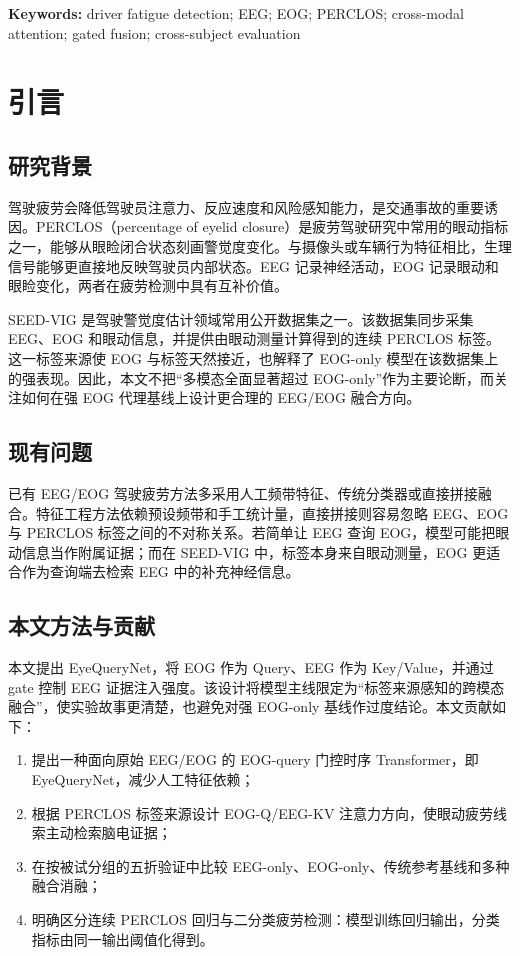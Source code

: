 \documentclass[UTF8,a4paper,10pt,fontset=windows]{ctexart}
\newcommand{\method}{EyeQueryNet}
\begin{document}
\noindent\textbf{Keywords:} driver fatigue detection; EEG; EOG; PERCLOS; cross-modal attention; gated fusion; cross-subject evaluation

\section{引言}

\subsection{研究背景}
驾驶疲劳会降低驾驶员注意力、反应速度和风险感知能力，是交通事故的重要诱因。PERCLOS（percentage of eyelid closure）是疲劳驾驶研究中常用的眼动指标之一，能够从眼睑闭合状态刻画警觉度变化\cite{dinges1998perclos}。与摄像头或车辆行为特征相比，生理信号能够更直接地反映驾驶员内部状态。EEG 记录神经活动，EOG 记录眼动和眼睑变化，两者在疲劳检测中具有互补价值。

SEED-VIG 是驾驶警觉度估计领域常用公开数据集之一。该数据集同步采集 EEG、EOG 和眼动信息，并提供由眼动测量计算得到的连续 PERCLOS 标签\cite{seedvig,zheng2017}。这一标签来源使 EOG 与标签天然接近，也解释了 EOG-only 模型在该数据集上的强表现。因此，本文不把“多模态全面显著超过 EOG-only”作为主要论断，而关注如何在强 EOG 代理基线上设计更合理的 EEG/EOG 融合方向。

\subsection{现有问题}
已有 EEG/EOG 驾驶疲劳方法多采用人工频带特征、传统分类器或直接拼接融合。特征工程方法依赖预设频带和手工统计量，直接拼接则容易忽略 EEG、EOG 与 PERCLOS 标签之间的不对称关系。若简单让 EEG 查询 EOG，模型可能把眼动信息当作附属证据；而在 SEED-VIG 中，标签本身来自眼动测量，EOG 更适合作为查询端去检索 EEG 中的补充神经信息。

\subsection{本文方法与贡献}
本文提出 \method，将 EOG 作为 Query、EEG 作为 Key/Value，并通过 gate 控制 EEG 证据注入强度。该设计将模型主线限定为“标签来源感知的跨模态融合”，使实验故事更清楚，也避免对强 EOG-only 基线作过度结论。本文贡献如下：
\begin{enumerate}
  \item 提出一种面向原始 EEG/EOG 的 EOG-query 门控时序 Transformer，即 \method，减少人工特征依赖；
  \item 根据 PERCLOS 标签来源设计 EOG-Q/EEG-KV 注意力方向，使眼动疲劳线索主动检索脑电证据；
  \item 在按被试分组的五折验证中比较 EEG-only、EOG-only、传统参考基线和多种融合消融；
  \item 明确区分连续 PERCLOS 回归与二分类疲劳检测：模型训练回归输出，分类指标由同一输出阈值化得到。
\end{enumerate}
\end{document}
